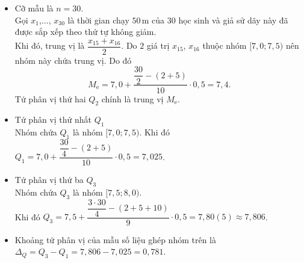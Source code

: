 \begin{ex}
{\begin{itemchoice}
\begin{itemize}
 \item Cỡ mẫu là $n=30$.\\
 Gọi $x_{1}$,$\ldots$, $x_{30}$ là thời gian chạy $50$\,m của $30$ học sinh và giả sử dãy này đã được sắp xếp theo thứ tự không giảm.\\
 Khi đó, trung vị là $\dfrac{x_{15}+x_{16}}{2}$. Do $2$ giá trị $x_{15}$, $x_{16}$ thuộc nhóm $[7{,}0;7{,}5)$ nên nhóm này chứa trung vị. Do đó
 \[
 M_{\text{e}}=7{,}0+\dfrac{\dfrac{30}{2}-(2+5)}{10} \cdot 0{,}5=7{,}4.
 \]
 Tứ phân vị thứ hai $Q_{2}$ chính là trung vị $M_{\text{e}}$.
 \item Tứ phân vị thứ nhất $Q_{1}$\\
 Nhóm chứa $Q_{1}$ là nhóm $[7{,}0;7{,}5)$. Khi đó $Q_{1}=7{,}0+\dfrac{\dfrac{30}{4}-(2+5)}{10} \cdot 0{,}5=7{,}025$.
 \item Tứ phân vị thứ ba $Q_{3}$\\
 Nhóm chứa $Q_{3}$ là nhóm $[7{,}5;8{,}0)$.\\
 Khi đó $Q_{3}=7{,}5+\dfrac{\dfrac{3\cdot30}{4}-(2+5+10)}{9} \cdot 0{,}5=7{,}80(5) \approx 7{,}806$.
 \item Khoảng tứ phân vị của mẫu số liệu ghép nhóm trên là $\Delta_{Q}=Q_{3}-Q_{1}=7{,}806-7{,}025=0{,}781$.
 \end{itemize}
 \end{itemchoice}
 }
\end{ex}

